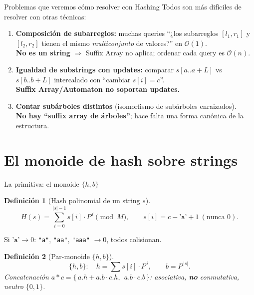 \documentclass{beamer}
\newtheorem{definicion}{Definición}
\begin{document}
\begin{frame}{Problemas que veremos cómo resolver con Hashing}
Todos son más difíciles de resolver con otras técnicas:
\begin{enumerate}
    \item \textbf{Composición de subarreglos:} muchas queries ``¿los subarreglos $[l_1,r_1]$ y $[l_2,r_2]$ tienen el mismo \emph{multiconjunto} de valores?'' en $\mathcal{O}(1)$.\\
    {\small\textbf{No es un string} $\Rightarrow$ Suffix Array no aplica; ordenar cada query es $\mathcal{O}(n)$.}
    \item \textbf{Igualdad de substrings con updates:} comparar $s[a..a{+}L]$ vs $s[b..b{+}L]$ intercalado con ``cambiar $s[i]=c$''.\\
    {\small\textbf{Suffix Array/Automaton no soportan updates.}}
    \item \textbf{Contar subárboles distintos} (isomorfismo de subárboles enraizados).\\
    {\small\textbf{No hay ``suffix array de árboles''}; hace falta una forma canónica de la estructura.}
\end{enumerate}
\end{frame}

\section{El monoide de hash sobre strings}

\begin{frame}{La primitiva: el monoide $\{h, b\}$}
\begin{definicion}[Hash polinomial de un string $s$]
\[
H(s) = \sum_{i=0}^{|s|-1} s[i]\cdot P^{\,i} \pmod M,
\qquad s[i] = c - \texttt{'a'} + 1 \ (\text{nunca } 0).
\]
\end{definicion}
{\small Si $\texttt{'a'}\to 0$: \texttt{"a"}, \texttt{"aa"}, \texttt{"aaa"} $\to 0$, todos colisionan.}
\begin{definicion}[Par-monoide $\{h,b\}$]
\[
\{h, b\}: \quad h = \sum s[i]\cdot P^{\,i}, \qquad b = P^{\,|s|}.
\]
Concatenación $a * c = \{\,a.h + a.b\cdot c.h,\ \ a.b\cdot c.b\,\}$:
asociativa, \textbf{no} conmutativa, neutro $\{0,1\}$.
\end{definicion}
\end{frame}
\end{document}
